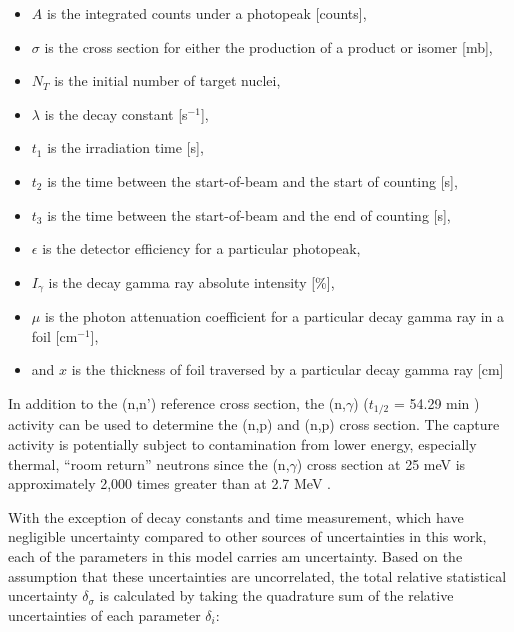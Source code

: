 \documentclass[5p]{elsarticle}
\newcommand{\comment}[1]{\todo[color=blue!20!white,inline]{ASV: #1}}
\begin{document}
\begin{itemize}
  

\item $A$ is the integrated counts under a photopeak [counts],

\item $\sigma$ is the cross section for either the production of a product or isomer [mb],

\item $N_T$ is the initial number of target nuclei,

\item $\lambda$  is the decay constant [s$^{-1}$],

\item $t_1$ is the irradiation time [s],

\item $t_2$ is the time between the start-of-beam and the start of counting [s],

\item $t_3$ is the time  between the start-of-beam and the end of counting [s],

\item $\epsilon$ is the  detector efficiency for a particular photopeak,

\item $I_\gamma$ is the decay gamma ray absolute intensity [\%],

\item $\mu$ is the photon attenuation coefficient for a particular decay gamma ray in a foil [cm$^{-1}$],

\item and $x$ is the thickness of foil traversed by a particular decay gamma ray [cm] 
\end{itemize}

In addition to the (n,n') reference cross section, the (n,$\gamma$)  ($t_{1/2}$ = 54.29 min \cite{Blachot2010}) activity can be used to determine the  (n,p) and (n,p) cross section.
 The capture activity is potentially subject to contamination from lower energy, especially thermal, \enquote{room return} neutrons since the (n,$\gamma$) cross section at 25 meV is approximately 2,000 times greater than at 2.7 MeV  \cite{Capote2012,zsolnay2012technical}.
   




With the exception of decay constants  and time measurement, which have negligible uncertainty compared to other sources of uncertainties in this work, each of the parameters in this model carries am uncertainty.
Based on the assumption that these uncertainties are uncorrelated, the total relative statistical uncertainty $\delta_\sigma$ is calculated by taking the quadrature sum of the relative uncertainties of each parameter  $\delta_i$:
\end{document}
